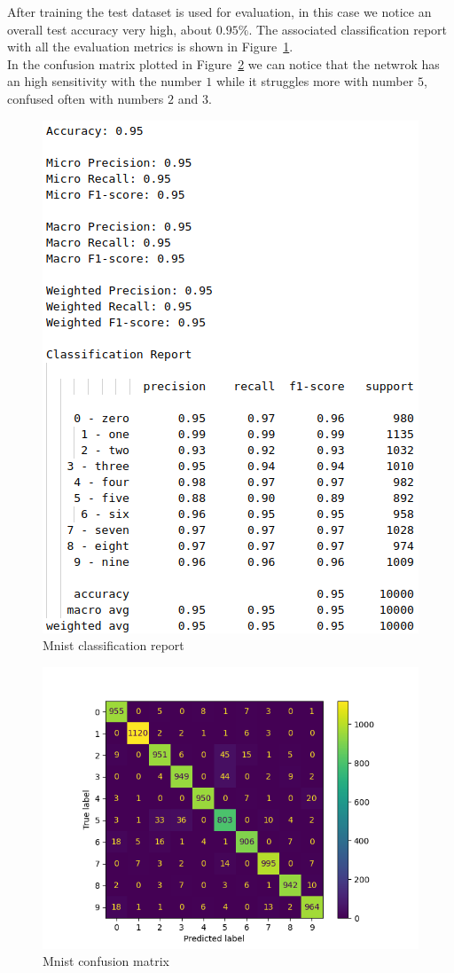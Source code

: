\documentclass[12pt, letterpaper, twoside]{article}
\begin{document}
After training the test dataset is used for evaluation, in this case we notice an overall test accuracy very high, about $0.95\%$. The associated classification report with all the evaluation metrics is shown in Figure~\ref{fig:mnist_class_report}.\\

In the confusion matrix plotted in Figure~\ref{fig:mnist_cm} we can notice that the netwrok has an high sensitivity with the number $1$ while it struggles more with number $5$, confused often with numbers $2$ and $3$.

\begin{figure}[ht]
	\centering
	\includegraphics[width=.5\textwidth]{report_mnist_small.png}
	\caption{Mnist classification report}
	\label{fig:mnist_class_report}
\end{figure}

\begin{figure}[H]
	\centering
	\includegraphics[width=.8\textwidth]{cm_mnist_small.png}
	\caption{Mnist confusion matrix}
	\label{fig:mnist_cm}
\end{figure}
\end{document}
